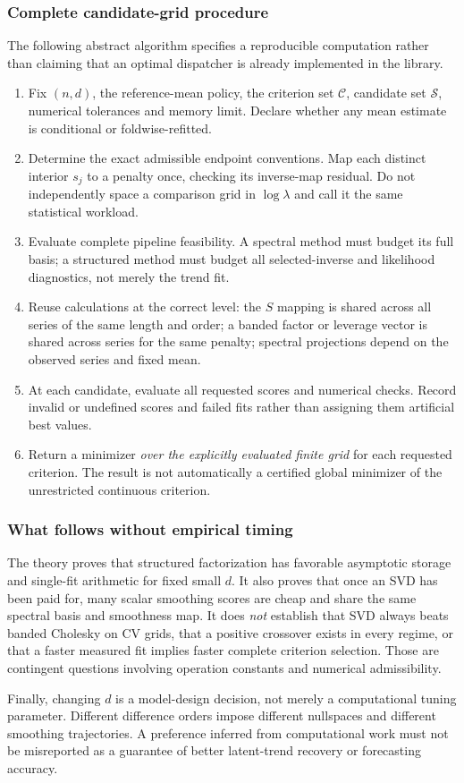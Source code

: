 \subsubsection{Complete candidate-grid procedure}
The following abstract algorithm specifies a reproducible computation rather than claiming that an optimal dispatcher is already implemented in the library.
\begin{enumerate}[leftmargin=*]
\item Fix $(n,d)$, the reference-mean policy, the criterion set $\mathcal C$, candidate set $\mathcal S$, numerical tolerances and memory limit. Declare whether any mean estimate is conditional or foldwise-refitted.
\item Determine the exact admissible endpoint conventions. Map each distinct interior $s_j$ to a penalty once, checking its inverse-map residual. Do not independently space a comparison grid in $\log\lambda$ and call it the same statistical workload.
\item Evaluate complete pipeline feasibility. A spectral method must budget its full basis; a structured method must budget all selected-inverse and likelihood diagnostics, not merely the trend fit.
\item Reuse calculations at the correct level: the $S$ mapping is shared across all series of the same length and order; a banded factor or leverage vector is shared across series for the same penalty; spectral projections depend on the observed series and fixed mean.
\item At each candidate, evaluate all requested scores and numerical checks. Record invalid or undefined scores and failed fits rather than assigning them artificial best values.
\item Return a minimizer \emph{over the explicitly evaluated finite grid} for each requested criterion. The result is not automatically a certified global minimizer of the unrestricted continuous criterion.
\end{enumerate}

\subsubsection{What follows without empirical timing}
The theory proves that structured factorization has favorable asymptotic storage and single-fit arithmetic for fixed small $d$. It also proves that once an SVD has been paid for, many scalar smoothing scores are cheap and share the same spectral basis and smoothness map. It does \emph{not} establish that SVD always beats banded Cholesky on CV grids, that a positive crossover exists in every regime, or that a faster measured fit implies faster complete criterion selection. Those are contingent questions involving operation constants and numerical admissibility.

Finally, changing $d$ is a model-design decision, not merely a computational tuning parameter. Different difference orders impose different nullspaces and different smoothing trajectories. A preference inferred from computational work must not be misreported as a guarantee of better latent-trend recovery or forecasting accuracy.
